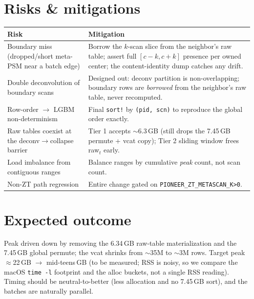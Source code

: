 \documentclass[11pt]{article}
\newcommand{\code}[1]{\texttt{\small #1}}
\begin{document}
\section{Risks \& mitigations}
\begin{center}
\begin{tabular}{p{5.4cm}p{8.6cm}}
\toprule
Risk & Mitigation \\
\midrule
Boundary miss (dropped/short meta-PSM near a batch edge) & Borrow the $k$-scan slice from the
neighbor's raw table; assert full $[c{-}k,c{+}k]$ presence per owned center; the
content-identity dump catches any drift. \\
Double deconvolution of boundary scans & Designed out: deconv partition is non-overlapping;
boundary rows are \emph{borrowed} from the neighbor's raw table, never recomputed. \\
Row-order $\rightarrow$ LGBM non-determinism & Final \code{sort!} by \code{(pid, scn)}
to reproduce the global order exactly. \\
Raw tables coexist at the deconv$\rightarrow$collapse barrier & Tier 1 accepts $\sim$6.3\,GB
(still drops the 7.45\,GB permute + vcat copy); Tier 2 sliding window frees raw$_t$ early. \\
Load imbalance from contiguous ranges & Balance ranges by cumulative \emph{peak} count,
not scan count. \\
Non-ZT path regression & Entire change gated on \code{PIONEER\_ZT\_METASCAN\_K>0}. \\
\bottomrule
\end{tabular}
\end{center}

\section{Expected outcome}
Peak driven down by removing the 6.34\,GB raw-table materialization and the 7.45\,GB global
permute; the vcat shrinks from $\sim$35M to $\sim$3M rows. Target peak $\approx$22\,GB
$\rightarrow$ mid-teens\,GB (to be measured; RSS is noisy, so we compare the macOS
\code{time -l} footprint and the alloc buckets, not a single RSS reading). Timing should be
neutral-to-better (less allocation and no 7.45\,GB sort), and the batches are naturally parallel.
\end{document}
